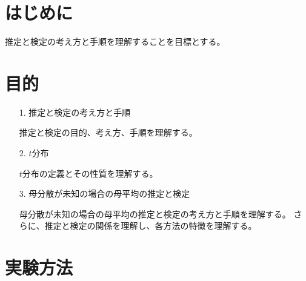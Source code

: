 \documentclass[12pt]{jarticle}
\begin{document}



\section{はじめに}

推定と検定の考え方と手順を理解することを目標とする。

\section{目的}
\begin{itemize}
    \item [1.]推定と検定の考え方と手順

          推定と検定の目的、考え方、手順を理解する。
    \item [2.]$t$分布

          $t$分布の定義とその性質を理解する。
    \item [3.]母分散が未知の場合の母平均の推定と検定

          母分散が未知の場合の母平均の推定と検定の考え方と手順を理解する。
          さらに、推定と検定の関係を理解し、各方法の特徴を理解する。
\end{itemize}

\section{実験方法}
\end{document}
